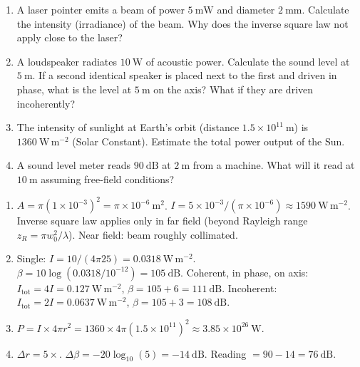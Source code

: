\documentclass[11pt]{article}
\begin{document}
\begin{exercice}
\begin{enumerate}
\item A laser pointer emits a beam of power $5\ \mathrm{mW}$ and diameter $2\ \mathrm{mm}$. Calculate the intensity (irradiance) of the beam. Why does the inverse square law not apply close to the laser?
\item A loudspeaker radiates $10\ \mathrm{W}$ of acoustic power. Calculate the sound level at $5\ \mathrm{m}$. If a second identical speaker is placed next to the first and driven in phase, what is the level at $5\ \mathrm{m}$ on the axis? What if they are driven incoherently?
\item The intensity of sunlight at Earth's orbit (distance $1.5 \times 10^{11}\ \mathrm{m}$) is $1360\ \mathrm{W\,m^{-2}}$ (Solar Constant). Estimate the total power output of the Sun.
\item A sound level meter reads $90\ \mathrm{dB}$ at $2\ \mathrm{m}$ from a machine. What will it read at $10\ \mathrm{m}$ assuming free-field conditions?
\end{enumerate}
\end{exercice}

\begin{corrige}
\begin{enumerate}
\item $A = \pi (1\times 10^{-3})^2 = \pi \times 10^{-6}\ \mathrm{m^2}$. $I = 5\times 10^{-3} / (\pi \times 10^{-6}) \approx 1590\ \mathrm{W\,m^{-2}}$. Inverse square law applies only in far field (beyond Rayleigh range $z_R = \pi w_0^2/\lambda$). Near field: beam roughly collimated.
\item Single: $I = 10/(4\pi 25) = 0.0318\ \mathrm{W\,m^{-2}}$. $\beta = 10\log(0.0318/10^{-12}) = 105\ \mathrm{dB}$.
Coherent, in phase, on axis: $I_{\text{tot}} = 4I = 0.127\ \mathrm{W\,m^{-2}}$, $\beta = 105 + 6 = 111\ \mathrm{dB}$.
Incoherent: $I_{\text{tot}} = 2I = 0.0637\ \mathrm{W\,m^{-2}}$, $\beta = 105 + 3 = 108\ \mathrm{dB}$.
\item $P = I \times 4\pi r^2 = 1360 \times 4\pi (1.5\times 10^{11})^2 \approx 3.85 \times 10^{26}\ \mathrm{W}$.
\item $\Delta r = 5\times$. $\Delta \beta = -20\log_{10}(5) = -14\ \mathrm{dB}$. Reading $= 90 - 14 = 76\ \mathrm{dB}$.
\end{enumerate}
\end{corrige}
\end{document}
